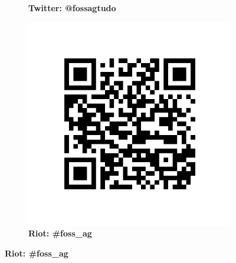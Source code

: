 \documentclass[a4paper,12pt,twoside]{article}
\begin{document}
\begin{landscape}
\begin{figure}[h]
\begin{subfigure}[h]{0.47\textwidth}
				\caption*{\Large \textbf{Twitter: @fossagtudo}}
			\end{subfigure}
			\begin{subfigure}[h]{0.47\textwidth}
				\includegraphics[scale=0.55]{codes/matrix.png}
				\caption*{\Large \textbf{Riot: \#foss\_ag}}
			\end{subfigure}
		\end{figure}
	\end{landscape}
\end{document}
